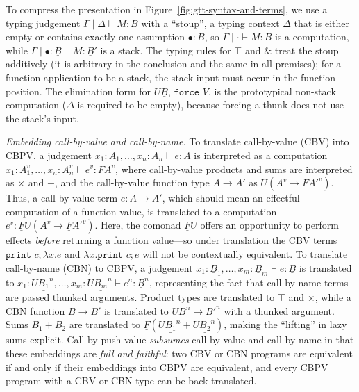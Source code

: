\documentclass[acmsmall,screen,12pt]{acmart}
\newif\ifshort
\renewcommand{\u}{\underline}
\newcommand{\print}{\kw{print}}
\newcommand{\kw}[1]{\texttt{#1}\,\,}
\newcommand{\force}{\kw{force}}
\newcommand{\with}{\mathbin{\&}}
\begin{document}
To compress the presentation in Figure~\ref{fig:gtt-syntax-and-terms},
we use a typing judgement $\Gamma \mid \Delta \vdash M : \u B$ with a
``stoup'', a typing context $\Delta$ that is either
empty or contains exactly one assumption $\bullet : \u B$, so $\Gamma
\mid \cdot \vdash M : \u B$ is a computation, while $\Gamma \mid \bullet
: \u B \vdash M : \u B'$ is a stack.  The \ifshort{(omitted) }\fi typing
rules for $\top$ and $\with$ treat the stoup additively
(it is arbitrary in the conclusion and the same in all premises); for a
function application to be a stack, the stack input must occur in the
function position.  The elimination form for $U \u B$, $\force{V}$, is
the prototypical non-stack computation ($\Delta$ is required to be
empty), because forcing a thunk does not use the stack's input.

\emph{Embedding call-by-value and call-by-name.}  To translate
call-by-value (CBV) into CBPV, a judgement $x_1 : A_1, \ldots, x_n : A_n
\vdash e : A$ is interpreted as a computation $x_1 : A_1^v, \ldots, x_n
: A_n^v \vdash e^v : \u F A^v$, where call-by-value products and sums
are interpreted as $\times$ and $+$, and the call-by-value function type
$A \to A'$ as $U(A^v \to \u F A'^v)$.  Thus, a call-by-value term $e : A
\to A'$, which should mean an effectful computation of a function value,
is translated to a computation $e^v : \u F U (A^v \to \u F A'^v)$. Here,
the comonad $\u F U$ offers an opportunity to perform effects
\emph{before} returning a function value---so under translation the CBV
terms $\print c; \lambda x. e$ and $\lambda x.\print c; e$ will not be
contextually equivalent.  To translate call-by-name (CBN) to CBPV, a
judgement $x_1 : \u B_1, \ldots, x_m : \u B_m \vdash e : \u B$ is
translated to $x_1 : U \u {B_1}^n, \ldots, x_m : U \u {B_m}^n \vdash e^n
: \u B^n$, representing the fact that call-by-name terms are passed
thunked arguments.  Product types are translated to $\top$ and $\times$,
while a CBN function $B \to B'$ is translated to $U \u B^n \to \u B'^n$
with a thunked argument.  Sums $B_1 + B_2$ are translated to $\u F (U \u
{B_1}^n + U \u {B_2}^n)$, making the ``lifting'' in lazy sums explicit.
Call-by-push-value \emph{subsumes} call-by-value and call-by-name in
that these embeddings are \emph{full and faithful}: two CBV or CBN programs are
equivalent if and only if their embeddings into CBPV are equivalent, and
every CBPV program with a CBV or CBN type can be back-translated.

\end{document}
